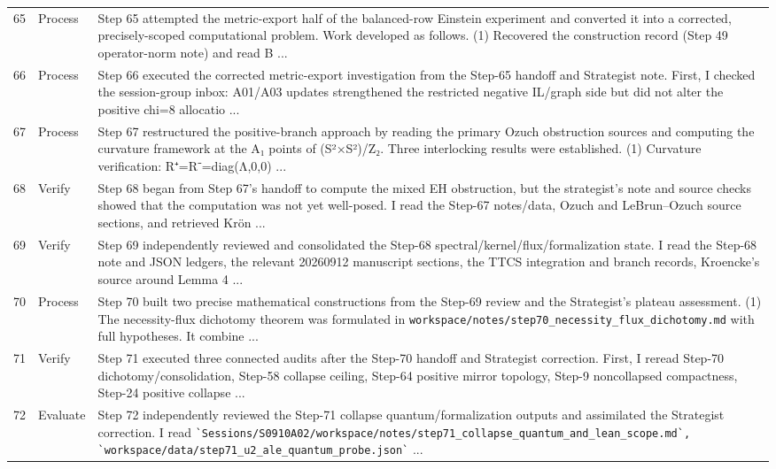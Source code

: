 \documentclass[UTF8,fontset=fandol,zihao=-4]{ctexart}
\begin{document}
\begin{longtable}{r p{} >{\raggedright\arraybackslash}p{}}
65 & Process & Step 65 attempted the metric-export half of the balanced-row Einstein experiment and converted it into a corrected, precisely-scoped computational problem. Work developed as follows. (1) Recovered the construction record (Step 49 operator-norm note) and read B ...\\
66 & Process & Step 66 executed the corrected metric-export investigation from the Step-65 handoff and Strategist note. First, I checked the session-group inbox: A01/A03 updates strengthened the restricted negative IL/graph side but did not alter the positive chi=8 allocatio ...\\
67 & Process & Step 67 restructured the positive-branch approach by reading the primary Ozuch obstruction sources and computing the curvature framework at the A₁ points of (S²×S²)/Z₂. Three interlocking results were established. (1) Curvature verification: R⁺=R⁻=diag(Λ,0,0)  ...\\
68 & Verify & Step 68 began from Step 67's handoff to compute the mixed EH obstruction, but the strategist's note and source checks showed that the computation was not yet well-posed. I read the Step-67 notes/data, Ozuch and LeBrun--Ozuch source sections, and retrieved Krön ...\\
69 & Verify & Step 69 independently reviewed and consolidated the Step-68 spectral/kernel/flux/formalization state. I read the Step-68 note and JSON ledgers, the relevant 20260912 manuscript sections, the TTCS integration and branch records, Kroencke's source around Lemma 4 ...\\
70 & Process & Step 70 built two precise mathematical constructions from the Step-69 review and the Strategist's plateau assessment. (1) The necessity-flux dichotomy theorem was formulated in \nolinkurl{workspace/notes/step70_necessity_flux_dichotomy.md} with full hypotheses. It combine ...\\
71 & Verify & Step 71 executed three connected audits after the Step-70 handoff and Strategist correction. First, I reread Step-70 dichotomy/consolidation, Step-58 collapse ceiling, Step-64 positive mirror topology, Step-9 noncollapsed compactness, Step-24 positive collapse ...\\
72 & Evaluate & Step 72 independently reviewed the Step-71 collapse quantum/formalization outputs and assimilated the Strategist correction. I read \nolinkurl{`Sessions/S0910A02/workspace/notes/step71_collapse_quantum_and_lean_scope.md`,} \nolinkurl{`workspace/data/step71_u2_ale_quantum_probe.json`} ...\\

\end{longtable}
\end{document}
